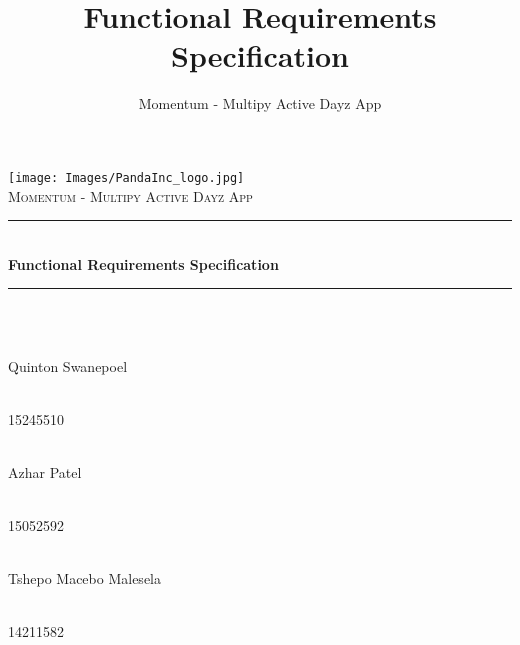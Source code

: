 \documentclass[11pt]{article}
\author{Momentum - Multipy Active Dayz App}
\title{Functional Requirements Specification}
\begin{document}
	\begin{titlepage}
		
		\begin{center}
			\texttt{[image: Images/PandaInc\_logo.jpg]}\\[1cm] 
			\textsc{\LARGE Momentum - Multipy Active Dayz App}\\[0.3cm]
			\rule{\linewidth}{0.5mm} \\[1cm]
			{ \huge \bfseries Functional Requirements Specification}\\[0.5cm]
			\rule{\linewidth}{0.5mm} \\[1cm] 		
			
			
			\begin{minipage}{0.4\textwidth}
				\begin{flushleft} \large
					\emph{} \\
					Quinton {Swanepoel}
				\end{flushleft}
			\end{minipage}
			\begin{minipage}{0.4\textwidth}
				\begin{flushright} \large
					\emph{} \\
					15245510
				\end{flushright}
			\end{minipage}
			
			\begin{minipage}{0.4\textwidth}
				\begin{flushleft} \large
					\emph{} \\
					Azhar {Patel}
				\end{flushleft}
			\end{minipage}
			\begin{minipage}{0.4\textwidth}
				\begin{flushright} \large
					\emph{} \\
					15052592
				\end{flushright}
			\end{minipage}
			
			\begin{minipage}{0.4\textwidth}
				\begin{flushleft} \large
					\emph{} \\
					Tshepo Macebo {Malesela}
				\end{flushleft}
			\end{minipage}
			\begin{minipage}{0.4\textwidth}
				\begin{flushright} \large
					\emph{} \\
					14211582
				\end{flushright}
			\end{minipage}
			

\end{center}
\end{titlepage}
\end{document}
